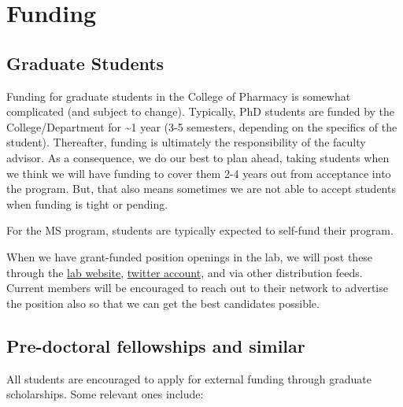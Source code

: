 \documentclass[
  letterpaper,
  DIV=11,
  numbers=noendperiod]{scrreprt}
\begin{document}

\hypertarget{sec-funding}{%
\chapter{Funding}\label{sec-funding}}

\hypertarget{graduate-students}{%
\section{Graduate Students}\label{graduate-students}}

Funding for graduate students in the College of Pharmacy is somewhat
complicated (and subject to change). Typically, PhD students are funded
by the College/Department for \textasciitilde1 year (3-5 semesters,
depending on the specifics of the student). Thereafter, funding is
ultimately the responsibility of the faculty advisor. As a consequence,
we do our best to plan ahead, taking students when we think we will have
funding to cover them 2-4 years out from acceptance into the program.
But, that also means sometimes we are not able to accept students when
funding is tight or pending.

For the MS program, students are typically expected to self-fund their
program.

When we have grant-funded position openings in the lab, we will post
these through the \href{https://cvmedlab.org/}{lab website},
\href{https://twitter.com/CVmedLab/}{twitter account}, and via other
distribution feeds. Current members will be encouraged to reach out to
their network to advertise the position also so that we can get the best
candidates possible.

\hypertarget{pre-doctoral-fellowships-and-similar}{%
\section*{Pre-doctoral fellowships and
similar}\label{pre-doctoral-fellowships-and-similar}}


All students are encouraged to apply for external funding through
graduate scholarships. Some relevant ones include:
\end{document}
